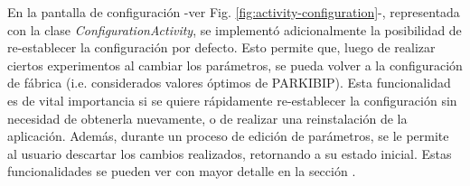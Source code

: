 En la pantalla de configuración -ver Fig. \ref{fig:activity-configuration}-, representada con la clase \textit{ConfigurationActivity}, se implementó adicionalmente la posibilidad de re-establecer la configuración por defecto. Esto permite que, luego de realizar ciertos experimentos al cambiar los parámetros, se pueda volver a la configuración de fábrica (i.e. considerados valores óptimos de PARKIBIP). Esta funcionalidad es de vital importancia si se quiere rápidamente re-establecer la configuración sin necesidad de obtenerla nuevamente, o de realizar una reinstalación de la aplicación. Además, durante un proceso de edición de parámetros, se le permite al usuario descartar los cambios realizados, retornando a su estado inicial. Estas funcionalidades se pueden ver con mayor detalle en la sección .

